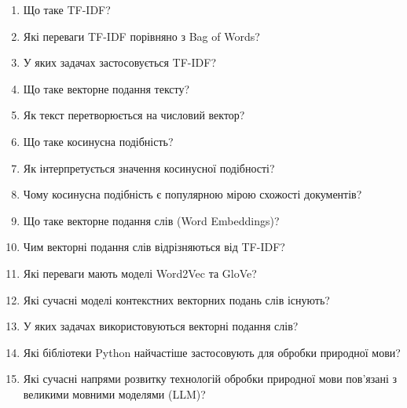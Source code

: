 \begin{enumerate}
\item Що таке TF-IDF?
\item Які переваги TF-IDF порівняно з Bag of Words?
\item У яких задачах застосовується TF-IDF?
\item Що таке векторне подання тексту?
\item Як текст перетворюється на числовий вектор?
\item Що таке косинусна подібність?
\item Як інтерпретується значення косинусної подібності?
\item Чому косинусна подібність є популярною мірою схожості документів?
\item Що таке векторне подання слів (Word Embeddings)?
\item Чим векторні подання слів відрізняються від TF-IDF?
\item Які переваги мають моделі Word2Vec та GloVe?
\item Які сучасні моделі контекстних векторних подань слів існують?
\item У яких задачах використовуються векторні подання слів?
\item Які бібліотеки Python найчастіше застосовують для обробки природної мови?
\item Які сучасні напрями розвитку технологій обробки природної мови пов'язані з великими мовними моделями (LLM)?
\end{enumerate}